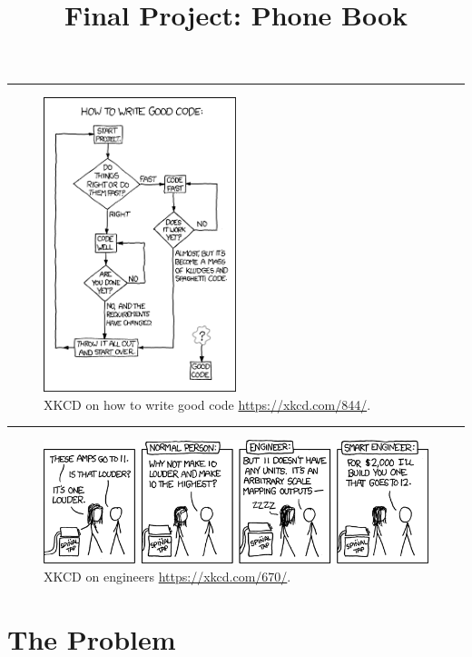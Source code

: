 \documentclass[11pt]{cselabheader}
\title{Final Project: Phone Book}
\begin{document}
\maketitle
{}
\hrule

\begin{figure}[H]
\centering
\includegraphics[width=0.5\textwidth]{img/xkcd_good_code.png}
\caption{XKCD on how to write good code \url{https://xkcd.com/844/}.}
\end{figure}

\hrule

\pagebreak
\tableofcontents

\begin{figure}[H]
\includegraphics[width=\textwidth]{img/xkcd_spinal_tap_amps.png}
\caption{XKCD on engineers \url{https://xkcd.com/670/}.}
\end{figure}

\pagebreak
{}

\section{The Problem}
\end{document}
